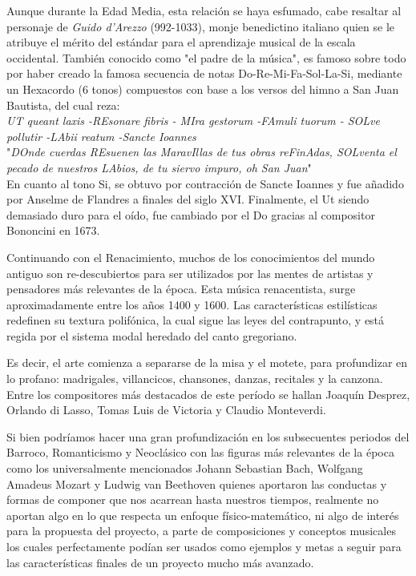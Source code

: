 \documentclass{book}
\begin{document}
	Aunque durante la Edad Media, esta relación se haya esfumado, cabe resaltar al personaje de \emph{Guido d'Arezzo} (992-1033), monje benedictino italiano quien se le atribuye el mérito del estándar para el aprendizaje musical de la escala occidental. También conocido como "el padre de la música", es famoso sobre todo por haber creado la famosa secuencia de notas Do-Re-Mi-Fa-Sol-La-Si, mediante un Hexacordo (6 tonos) compuestos con base a los versos del himno a San Juan Bautista, del cual reza:\\ \emph{UT queant laxis -REsonare fibris - MIra gestorum -FAmuli tuorum - SOLve pollutir -LAbii reatum -Sancte Ioannes}\\"\emph{DOnde cuerdas REsuenen las MaravIllas de tus obras reFinAdas, SOLventa el pecado de nuestros LAbios, de tu siervo impuro, oh San Juan}"\\ En cuanto al tono Si, se obtuvo por contracción de Sancte Ioannes y fue añadido por Anselme de Flandres a finales del siglo XVI. Finalmente, el Ut siendo demasiado duro para el oído, fue cambiado por el Do gracias al compositor Bononcini en 1673.~\citep{edadMedia}\par
	
	Continuando con el Renacimiento, muchos de los conocimientos del mundo antiguo son re-descubiertos para ser utilizados por las mentes de artistas y pensadores más relevantes de la época. Esta música renacentista, surge aproximadamente entre los años 1400 y 1600. Las características estilísticas redefinen su textura polifónica, la cual sigue las leyes del contrapunto, y está regida por el sistema modal heredado del canto gregoriano.\par
	
	\pagebreak Es decir, el arte comienza a separarse de la misa y el motete, para profundizar en lo profano: madrigales, villancicos, chansones, danzas, recitales y la canzona. Entre los compositores más destacados de este período se hallan Joaquín Desprez, Orlando di Lasso, Tomas Luis de Victoria y Claudio Monteverdi.~\citep{renacimiento}\par
	
	Si bien podríamos hacer una gran profundización en los subsecuentes periodos del Barroco, Romanticismo y Neoclásico con las figuras más relevantes de la época como los universalmente mencionados Johann Sebastian Bach, Wolfgang Amadeus Mozart y Ludwig van Beethoven quienes aportaron las conductas y formas de componer que nos acarrean hasta nuestros tiempos, realmente no aportan algo en lo que respecta un enfoque físico-matemático, ni algo de interés para la propuesta del proyecto, a parte de composiciones y conceptos musicales los cuales perfectamente podían ser usados como ejemplos y metas a seguir para las características finales de un proyecto mucho más avanzado.\par 
	
\end{document}

